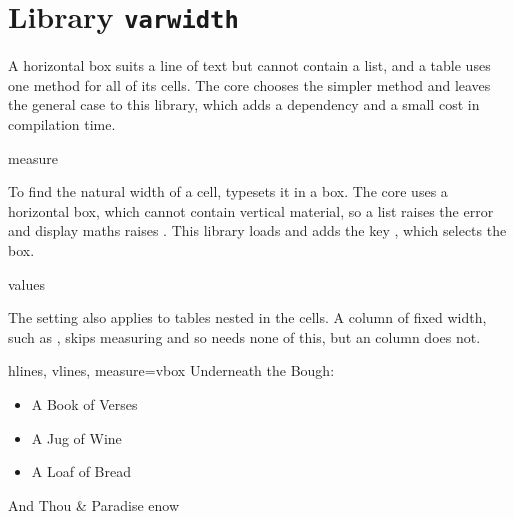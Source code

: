 \section{Library \texttt{varwidth}}\label{lib:varwidth}
A horizontal box suits a line of text but cannot contain a list, and a table uses one method for all of its cells. The core chooses the simpler method and leaves the general case to this library, which adds a dependency and a small cost in compilation time.

\begin{codedescribe}[
        key,
        new=2021N,
        update=2025A
    ]{measure}
    \begin{codesyntax}
    \end{codesyntax}
    To find the natural width of a cell,  typesets it in a box. The core uses a horizontal box, which cannot contain vertical material, so a list raises the error  and display maths raises . This library loads  and adds the key , which selects the box.
    \begin{describelist*}{values}
    \end{describelist*}
    The setting also applies to tables nested in the cells. A column of fixed width, such as , skips measuring and so needs none of this, but an  column does not.

    \begin{codestore}[st=lib:varwidth:vbox]
        \begin{tblr}{hlines, vlines, measure=vbox}
            Underneath the Bough:
            \begin{itemize}
                \item A Book of Verses
                \item A Jug of Wine
                \item A Loaf of Bread
            \end{itemize}
            And Thou & Paradise enow
        \end{tblr}\end{codestore}
    \begin{center}
    \end{center}


\end{codedescribe}

